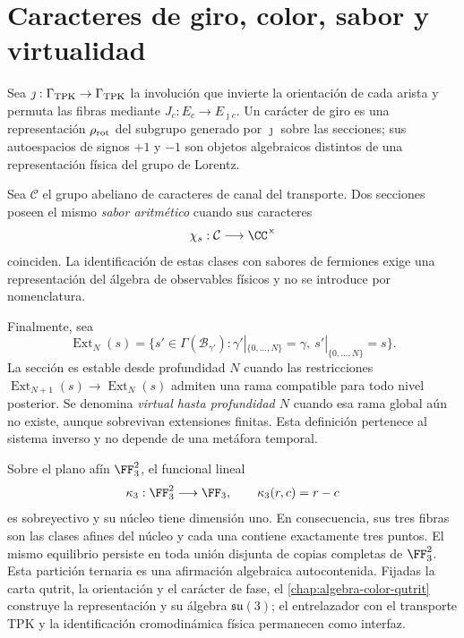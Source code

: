 \section{Caracteres de giro, color, sabor y virtualidad}

Sea \(\jmath:\Gamma_{\rm TPK}\to\Gamma_{\rm TPK}\) la involución que invierte
la orientación de cada arista y permuta las fibras mediante
\(J_c:E_c\to E_{\jmath c}\). Un carácter de giro es una representación
\(\rho_{\rm rot}\) del subgrupo generado por \(\jmath\) sobre las secciones;
sus autoespacios de signos \(+1\) y \(-1\) son objetos algebraicos distintos
de una representación física del grupo de Lorentz.

Sea \(\mathcal C\) el grupo abeliano de caracteres de canal del transporte.
Dos secciones poseen el mismo \emph{sabor aritmético} cuando sus caracteres
\[
 \chi_s:\mathcal C\longrightarrow\CC^\times
\]
coinciden. La identificación de estas clases con sabores de fermiones exige
una representación del álgebra de observables físicos y no se introduce por
nomenclatura.

Finalmente, sea
\[
 \operatorname{Ext}_N(s)=
 \{s'\in\Gamma(\mathcal B_{\gamma'}):
 \gamma'|_{\{0,\ldots,N\}}=\gamma,\ s'|_{\{0,\ldots,N\}}=s\}.
\]
La sección es estable desde profundidad \(N\) cuando las restricciones
\(\operatorname{Ext}_{N+1}(s)\to\operatorname{Ext}_N(s)\) admiten una rama
compatible para todo nivel posterior. Se denomina \emph{virtual hasta
profundidad \(N\)} cuando esa rama global aún no existe, aunque sobrevivan
extensiones finitas. Esta definición pertenece al sistema inverso y no
depende de una metáfora temporal.

Sobre el plano afín \(\FF_3^2\), el funcional lineal
\[
 \kappa_3:\FF_3^2\longrightarrow\FF_3,
 \qquad \kappa_3(r,c)=r-c
\]
es sobreyectivo y su núcleo tiene dimensión uno. En consecuencia, sus tres
fibras son las clases afines del núcleo y cada una contiene exactamente tres
puntos. El mismo equilibrio persiste en toda unión disjunta de copias
completas de \(\FF_3^2\). Esta partición ternaria es una afirmación algebraica
autocontenida. Fijadas la carta qutrit, la orientación y el carácter de fase,
el \cref{chap:algebra-color-qutrit} construye la representación y su álgebra
\(\mathfrak{su}(3)\); el entrelazador con el transporte TPK y la identificación
cromodinámica física permanecen como interfaz.
